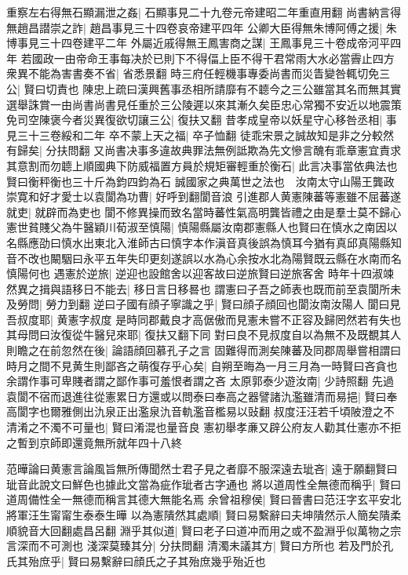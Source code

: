 重察左右得無石顯漏泄之姦|{
	石顯事見二十九卷元帝建昭二年重直用翻}
尚書納言得無趙昌譛崇之詐|{
	趙昌事見三十四卷哀帝建平四年}
公卿大臣得無朱博阿傅之援|{
	朱博事見三十四卷建平二年}
外屬近戚得無王鳳害商之謀|{
	王鳳事見三十卷成帝河平四年}
若國政一由帝命王事每决於已則下不得偪上臣不得干君常雨大水必當霽止四方衆異不能為害書奏不省|{
	省悉景翻}
時三府任輕機事專委尚書而災眚變咎輒切免三公|{
	賢曰切責也}
陳忠上疏曰漢興舊事丞相所請靡有不聼今之三公雖當其名而無其實選舉誅賞一由尚書尚書見任重於三公陵遲以來其漸久矣臣忠心常獨不安近以地震策免司空陳褒今者災異復欲切讓三公|{
	復扶又翻}
昔孝成皇帝以妖星守心移咎丞相|{
	事見三十三卷綏和二年}
卒不蒙上天之福|{
	卒子恤翻}
徒乖宋景之誠故知是非之分較然有歸矣|{
	分扶問翻}
又尚書决事多違故典罪法無例詆欺為先文慘言醜有乖章憲宜責求其意割而勿聼上順國典下防威福置方員於規矩審輕重於衡石|{
	此言决事當依典法也賢曰衡秤衡也三十斤為鈞四鈞為石}
誠國家之典萬世之法也　汝南太守山陽王龔政崇寛和好才愛士以袁閬為功曹|{
	好呼到翻閬音浪}
引進郡人黄憲陳蕃等憲雖不屈蕃遂就吏|{
	就辟而為吏也}
閬不修異操而致名當時蕃性氣高明龔皆禮之由是羣士莫不歸心憲世貧賤父為牛醫穎川荀淑至慎陽|{
	慎陽縣屬汝南郡憲縣人也賢曰在慎水之南因以名縣應劭曰慎水出東北入淮師古曰慎字本作滇音真後誤為慎耳今猶有真邱真陽縣知音不改也闞駰曰永平五年失印更刻遂誤以水為心余按水北為陽賢既云縣在水南而名慎陽何也}
遇憲於逆旅|{
	逆迎也設館舍以迎客故曰逆旅賢曰逆旅客舍}
時年十四淑竦然異之揖與語移日不能去|{
	移日言日移晷也}
謂憲曰子吾之師表也既而前至袁閬所未及勞問|{
	勞力到翻}
逆曰子國有顔子寧識之乎|{
	賢曰顔子顔回也閬汝南汝陽人}
閬曰見吾叔度耶|{
	黄憲字叔度}
是時同郡戴良才高倨傲而見憲未嘗不正容及歸罔然若有失也其母問曰汝復從牛醫兒來耶|{
	復扶又翻下同}
對曰良不見叔度自以為無不及既覩其人則瞻之在前忽然在後|{
	論語顔回慕孔子之言}
固難得而測矣陳蕃及同郡周舉嘗相謂曰時月之間不見黄生則鄙吝之萌復存乎心矣|{
	自朔至晦為一月三月為一時賢曰吝貪也余謂作事可卑賤者謂之鄙作事可羞恨者謂之吝}
太原郭泰少遊汝南|{
	少詩照翻}
先過袁閬不宿而退進往從憲累日方還或以問泰曰奉高之器譬諸氿濫雖清而易挹|{
	賢曰奉高閬字也爾雅側出氿泉正出濫泉氿音軌濫音檻易以䜴翻}
叔度汪汪若千頃陂澄之不清淆之不濁不可量也|{
	賢曰淆混也量音良}
憲初舉孝亷又辟公府友人勸其仕憲亦不拒之暫到京師即還竟無所就年四十八終

范曄論曰黄憲言論風旨無所傳聞然士君子見之者靡不服深遠去玼吝|{
	遠于願翻賢曰玼音此說文曰鮮色也據此文當為疵作玼者古字通也}
將以道周性全無德而稱乎|{
	賢曰道周備性全一無德而稱言其德大無能名焉}
余曾祖穆侯|{
	賢曰晉書曰范汪字玄平安北將軍汪生甯甯生泰泰生曄}
以為憲隤然其處順|{
	賢曰易繫辭曰夫坤隤然示人簡矣隤柔順貌音大回翻處昌呂翻}
淵乎其似道|{
	賢曰老子曰道冲而用之或不盈淵乎似萬物之宗言深而不可測也}
淺深莫臻其分|{
	分扶問翻}
清濁未議其方|{
	賢曰方所也}
若及門於孔氏其殆庶乎|{
	賢曰易繫辭曰顔氏之子其殆庶幾乎殆近也}


